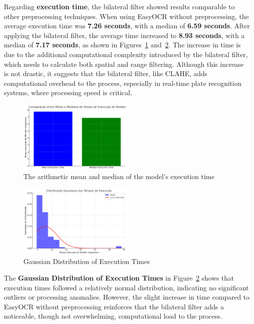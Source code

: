 \documentclass[conference]{IEEEtran}
\begin{document}
    Regarding \textbf{execution time}, the bilateral filter showed results comparable to other preprocessing techniques. When using EasyOCR without preprocessing, the average execution time was \textbf{7.26 seconds}, with a median of \textbf{6.59 seconds}. After applying the bilateral filter, the average time increased to \textbf{8.93 seconds}, with a median of \textbf{7.17 seconds}, as shown in Figures~\ref{img14} and~\ref{img15}. The increase in time is due to the additional computational complexity introduced by the bilateral filter, which needs to calculate both spatial and range filtering. Although this increase is not drastic, it suggests that the bilateral filter, like CLAHE, adds computational overhead to the process, especially in real-time plate recognition systems, where processing speed is critical.
    
    \begin{figure}[htbp]
        \centerline{\includegraphics[width=0.5\textwidth]{img14.png}}
        \caption{The arithmetic mean and median of the model's execution time}
        \label{img14}
    \end{figure}
    
    \begin{figure}[htbp]
        \centerline{\includegraphics[width=0.5\textwidth]{img15.png}}
        \caption{Gaussian Distribution of Execution Times}
        \label{img15}
    \end{figure}
    
    The \textbf{Gaussian Distribution of Execution Times} in Figure~\ref{img15} shows that execution times followed a relatively normal distribution, indicating no significant outliers or processing anomalies. However, the slight increase in time compared to EasyOCR without preprocessing reinforces that the bilateral filter adds a noticeable, though not overwhelming, computational load to the process.
    
\end{document}
